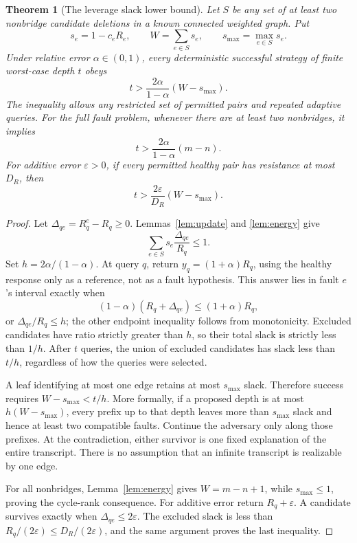 \documentclass[11pt,letterpaper]{article}
\newtheorem{theorem}{Theorem}
\begin{document}
\begin{theorem}[The leverage slack lower bound]\label{thm:energybound}
Let $S$ be any set of at least two nonbridge candidate deletions in a known connected weighted graph. Put
\[
 s_e=1-c_eR_e,\qquad W=\sum_{e\in S}s_e,\qquad
 s_{\max}=\max_{e\in S}s_e.
\]
Under relative error $\alpha\in(0,1)$, every deterministic successful strategy of finite worst-case depth $t$ obeys
\[
 t>\frac{2\alpha}{1-\alpha}(W-s_{\max}).
\]
The inequality allows any restricted set of permitted pairs and repeated adaptive queries. For the full fault problem, whenever there are at least two nonbridges, it implies
\[
 t>\frac{2\alpha}{1-\alpha}(m-n).
\]
For additive error $\varepsilon>0$, if every permitted healthy pair has resistance at most $D_R$, then
\[
 t>\frac{2\varepsilon}{D_R}(W-s_{\max}).
\]
\end{theorem}
\begin{proof}
Let $\Delta_{qe}=R_q^e-R_q\ge0$. Lemmas~\ref{lem:update} and \ref{lem:energy} give
\[
 \sum_{e\in S}s_e\frac{\Delta_{qe}}{R_q}\le1.
\]
Set $h=2\alpha/(1-\alpha)$. At query $q$, return $y_q=(1+\alpha)R_q$, using the healthy response only as a reference, not as a fault hypothesis. This answer lies in fault $e$'s interval exactly when
\[
 (1-\alpha)(R_q+\Delta_{qe})\le(1+\alpha)R_q,
\]
or $\Delta_{qe}/R_q\le h$; the other endpoint inequality follows from monotonicity. Excluded candidates have ratio strictly greater than $h$, so their total slack is strictly less than $1/h$. After $t$ queries, the union of excluded candidates has slack less than $t/h$, regardless of how the queries were selected.

A leaf identifying at most one edge retains at most $s_{\max}$ slack. Therefore success requires $W-s_{\max}<t/h$. More formally, if a proposed depth is at most $h(W-s_{\max})$, every prefix up to that depth leaves more than $s_{\max}$ slack and hence at least two compatible faults. Continue the adversary only along those prefixes. At the contradiction, either survivor is one fixed explanation of the entire transcript. There is no assumption that an infinite transcript is realizable by one edge.

For all nonbridges, Lemma~\ref{lem:energy} gives $W=m-n+1$, while $s_{\max}\le1$, proving the cycle-rank consequence. For additive error return $R_q+\varepsilon$. A candidate survives exactly when $\Delta_{qe}\le2\varepsilon$. The excluded slack is less than $R_q/(2\varepsilon)\le D_R/(2\varepsilon)$, and the same argument proves the last inequality.
\end{proof}
\end{document}
